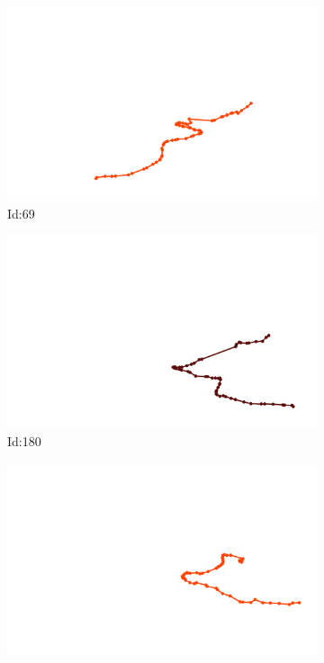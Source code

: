 \documentclass[12pt,twoside]{report}
\begin{document}
\begin{figure}
\centering
\begin{subfigure}[b]{0.20\textwidth}
\centering
\includegraphics[width=\textwidth]{../../trajectories/69.png}
\caption{Id:69}
\end{subfigure}
\begin{subfigure}[b]{0.20\textwidth}
\centering
\includegraphics[width=\textwidth]{../../trajectories/180.png}
\caption{Id:180}
\end{subfigure}
\begin{subfigure}[b]{0.20\textwidth}
\centering
\includegraphics[width=\textwidth]{../../trajectories/426.png}

\end{subfigure}
\end{figure}
\end{document}
